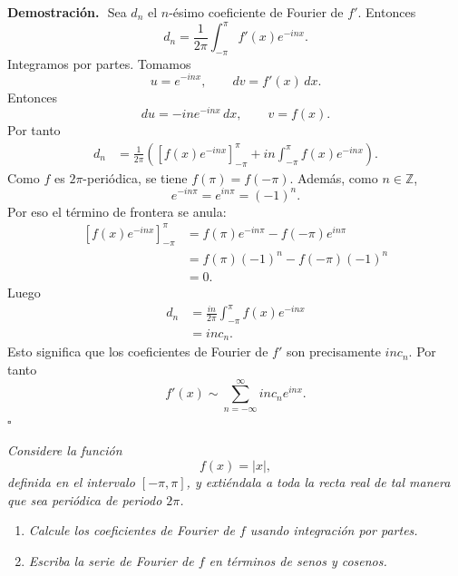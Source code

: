 \documentclass[11pt,letterpaper]{article}
\newcommand{\Z}{\mathbb{Z}}
\begin{document}
\textbf{Demostración.}\,\
Sea $d_n$ el $n$-ésimo coeficiente de Fourier de $f'$. Entonces
\begin{equation*}
    d_n=\frac{1}{2\pi}\int_{-\pi}^{\pi}f'(x)e^{-inx}.
\end{equation*}
Integramos por partes. Tomamos
\begin{equation*}
    u=e^{-inx},\qquad dv=f'(x)\,dx.
\end{equation*}
Entonces
\begin{equation*}
    du=-in e^{-inx}\,dx,
    \qquad
    v=f(x).
\end{equation*}
Por tanto
\begin{align*}
    d_n
    &=\frac{1}{2\pi}\left(\left[f(x)e^{-inx}\right]_{-\pi}^{\pi}
    +in\int_{-\pi}^{\pi}f(x)e^{-inx}\right).
\end{align*}
Como $f$ es $2\pi$-periódica, se tiene $f(\pi)=f(-\pi)$. Además, como $n\in\Z$,
\begin{equation*}
    e^{-in\pi}=e^{in\pi}=(-1)^n.
\end{equation*}
Por eso el término de frontera se anula:
\begin{align*}
    \left[f(x)e^{-inx}\right]_{-\pi}^{\pi}
    &=f(\pi)e^{-in\pi}-f(-\pi)e^{in\pi} \\
    &=f(\pi)(-1)^n-f(-\pi)(-1)^n \\
    &=0.
\end{align*}
Luego
\begin{align*}
    d_n
    &=\frac{in}{2\pi}\int_{-\pi}^{\pi}f(x)e^{-inx} \\
    &=in c_n.
\end{align*}
Esto significa que los coeficientes de Fourier de $f'$ son precisamente $inc_n$. Por tanto
\begin{equation*}
    f'(x)\sim \sum_{n=-\infty}^{\infty}inc_ne^{inx}.
\end{equation*}
\hfill $\square$

\vspace{0.4cm}
\begin{tcolorbox}[title=\textcolor{white}{Problema 6(a)-(b)}]
\textit{Considere la función}
\begin{equation*}
    f(x)=|x|,
\end{equation*}
\textit{definida en el intervalo $[-\pi,\pi]$, y extiéndala a toda la recta real de tal manera que sea periódica de periodo $2\pi$.}
\begin{enumerate}
    \item[\textbf{a)}] \textit{Calcule los coeficientes de Fourier de $f$ usando integración por partes.}
    \item[\textbf{b)}] \textit{Escriba la serie de Fourier de $f$ en términos de senos y cosenos.}
\end{enumerate}
\end{tcolorbox}
\end{document}
